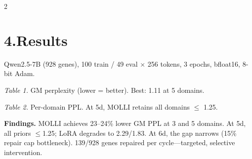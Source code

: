 \documentclass[9pt,letterpaper]{article}
\begin{document}
\begin{multicols}{2}
\section{4.\;Results}
Qwen2.5-7B (928 genes), 100 train / 49 eval $\times$ 256 tokens, 3 epochs, bfloat16, 8-bit Adam.

\vspace{2pt}
\vspace{1pt}
{\centering\scriptsize\color{ltgray}\textit{Table 1.} GM perplexity (lower = better). Best: 1.11 at 5 domains.\par}
\vspace{2pt}

\vspace{1pt}
{\centering\scriptsize\color{ltgray}\textit{Table 2.} Per-domain PPL. At 5d, MOLLI retains all domains $\leq$ 1.25.\par}
\vspace{2pt}

\textbf{Findings.}
MOLLI achieves 23--24\% lower GM PPL at 3 and 5 domains. At 5d, all priors $\leq$1.25; LoRA degrades to 2.29/1.83. At 6d, the gap narrows (15\% repair cap bottleneck). 139/928 genes repaired per cycle---targeted, selective intervention.

\end{multicols}
\end{document}
